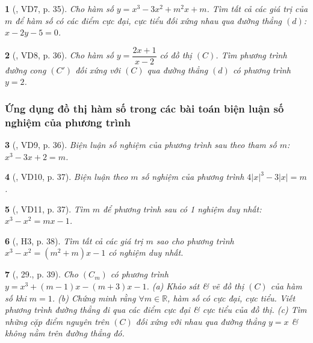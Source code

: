 \documentclass{article}
\newtheorem{baitoan}{}
\begin{document}
\begin{baitoan}[\cite{TLCT_giai_tich_12}, VD7, p. 35]
	Cho hàm số $y = x^3 - 3x^2 + m^2x + m$. Tìm tất cả các giá trị của $m$ để hàm số có các điểm cực đại, cực tiểu đối xứng nhau qua đường thẳng $(d)$: $x - 2y - 5 = 0$.
\end{baitoan}

\begin{baitoan}[\cite{TLCT_giai_tich_12}, VD8, p. 36]
	Cho hàm số $y = \dfrac{2x + 1}{x - 2}$ có đồ thị $(C)$. Tìm phương trình đường cong $(C')$ đối xứng với $(C)$ qua đường thẳng $(d)$ có phương trình $y = 2$. 
\end{baitoan}

\subsubsection{Ứng dụng đồ thị hàm số trong các bài toán biện luận số nghiệm của phương trình}

\begin{baitoan}[\cite{TLCT_giai_tich_12}, VD9, p. 36]
	Biện luận số nghiệm của phương trình sau theo tham số $m$: $x^3 - 3x + 2 = m$.
\end{baitoan}

\begin{baitoan}[\cite{TLCT_giai_tich_12}, VD10, p. 37]
	Biện luận theo $m$ số nghiệm của phương trình $4|x|^3 - 3|x| = m$.
\end{baitoan}

\begin{baitoan}[\cite{TLCT_giai_tich_12}, VD11, p. 37]
	Tìm $m$ để phương trình sau có 1 nghiệm duy nhất: $x^3 - x^2 = mx - 1$.
\end{baitoan}

\begin{baitoan}[\cite{TLCT_giai_tich_12}, H3, p. 38]
	Tìm tất cả các giá trị $m$ sao cho phương trình $x^3 - x^2 = (m^2 + m)x - 1$ có nghiệm duy nhất.
\end{baitoan}

\begin{baitoan}[\cite{TLCT_giai_tich_12}, 29., p. 39]
	Cho $(C_m)$ có phương trình $y = x^3 + (m - 1)x - (m + 3)x - 1$. (a) Khảo sát \& vẽ đồ thị $(C)$ của hàm số khi $m = 1$. (b) Chứng minh rằng $\forall m\in\mathbb{R}$, hàm số có cực đại, cực tiểu. Viết phương trình đường thẳng đi qua các điểm cực đại \& cực tiểu của đồ thị. (c) Tìm những cặp điểm nguyên trên $(C)$ đối xứng với nhau qua đường thẳng $y = x$ \& không nằm trên đường thẳng đó.	
\end{baitoan}
\end{document}
